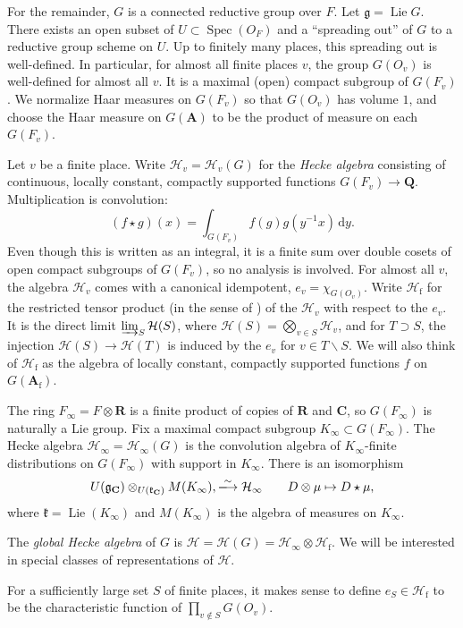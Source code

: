 \documentclass{article}
\DeclareMathOperator{\lie}{Lie}
\DeclareMathOperator{\spectrum}{Spec}
\newcommand{\dA}{\mathbf{A}}
\newcommand{\dC}{\mathbf{C}}
\newcommand{\dR}{\mathbf{R}}
\newcommand{\dQ}{\mathbf{Q}}
\newcommand{\fg}{\mathfrak{g}}
\newcommand{\fk}{\mathfrak{k}}
\newcommand{\dd}{\mathrm{d}}
\newcommand{\finite}{\mathrm{f}}
\newcommand{\hecke}{\mathcal{H}}
\newcommand{\iso}{\xlongrightarrow\sim}
\begin{document}
For the remainder, $G$ is a connected reductive group over $F$. Let 
$\fg=\lie G$. There exists 
an open subset of $U\subset \spectrum(O_F)$ and a ``spreading out'' of $G$ to 
a reductive group scheme on $U$. Up to finitely many places, this spreading out 
is well-defined. In particular, for almost all finite places $v$, the group 
$G(O_v)$ is well-defined for almost all $v$. It is a maximal (open) compact 
subgroup of $G(F_v)$. We normalize Haar measures on $G(F_v)$ so that 
$G(O_v)$ has volume $1$, and choose the Haar measure on $G(\dA)$ to be the 
product of measure on each $G(F_v)$. 

Let $v$ be a finite place. Write $\hecke_v=\hecke_v(G)$ for the \emph{Hecke 
algebra} consisting of continuous, locally constant, compactly supported 
functions $G(F_v) \to \dQ$. Multiplication is convolution: 
\[
  (f\star g)(x) = \int_{G(F_v)} f(g) g(y^{-1} x)\, \dd y .
\]
Even though this is written as an integral, it is a finite sum over double 
cosets of open compact subgroups of $G(F_v)$, so no analysis is involved. For 
almost all $v$, the algebra $\hecke_v$ comes with a canonical idempotent, 
$e_v=\chi_{G(O_v)}$. Write $\hecke_\finite$ for the restricted tensor product 
(in the sense of \cite[\S 2]{f79}) of the $\hecke_v$ with respect to the 
$e_v$. It is the direct limit $\varinjlim_S \hecke(S)$, where 
$\hecke(S)=\bigotimes_{v\in S} \hecke_v$, and for 
$T\supset S$, the injection $\hecke(S)\to \hecke(T)$ is induced by the 
$e_v$ for $v\in T\smallsetminus S$. We will also think of $\hecke_\finite$ as 
the algebra of locally constant, compactly supported functions $f$ on 
$G(\dA_\finite)$. 

The ring $F_\infty=F\otimes\dR$ is a finite product of copies of $\dR$ and 
$\dC$, so  $G(F_\infty)$ is naturally a Lie group. Fix a maximal compact 
subgroup $K_\infty\subset G(F_\infty)$. The Hecke algebra 
$\hecke_\infty=\hecke_\infty(G)$ is the convolution algebra of $K_\infty$-finite 
distributions on $G(F_\infty)$ with support in $K_\infty$. There is an 
isomorphism 
\[
  U(\fg_\dC)\otimes_{U(\fk_\dC)} M(K_\infty), \iso \hecke_\infty \qquad D\otimes \mu\mapsto D\star \mu ,
\]
where $\fk=\lie(K_\infty)$ and $M(K_\infty)$ is the algebra of measures on 
$K_\infty$. 

The \emph{global Hecke algebra} of $G$ is 
$\hecke=\hecke(G)=\hecke_\infty\otimes\hecke_\finite$. We will be interested in 
special classes of representations of $\hecke$. 

For a sufficiently large set $S$ of finite places, it makes sense to define 
$e_S\in \hecke_\finite$ to be the characteristic function of 
$\prod_{v\notin S} G(O_v)$. 
\end{document}
